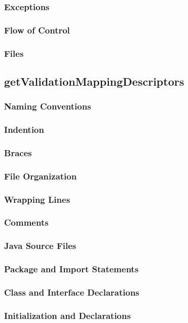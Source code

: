 \documentclass{article}
\begin{document}
\subsubsection{Exceptions}
\subsubsection{Flow of Control}
\subsubsection{Files}

\subsection{getValidationMappingDescriptors}

\subsubsection{Naming Conventions}
\subsubsection{Indention}
\subsubsection{Braces}
\subsubsection{File Organization}
\subsubsection{Wrapping Lines}
\subsubsection{Comments}
\subsubsection{Java Source Files}
\subsubsection{Package and Import Statements}
\subsubsection{Class and Interface Declarations}
\subsubsection{Initialization and Declarations}
\end{document}
